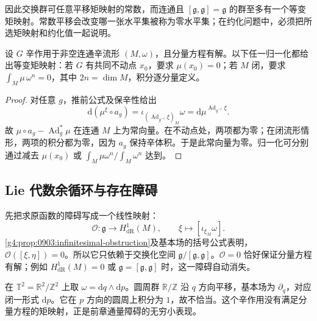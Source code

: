 因此交换群可任意平移矩映射的常数，而连通且 \([\mathfrak g,\mathfrak g]=\mathfrak g\) 的群至多有一个等变矩映射。常数平移会改变哪一张水平集被称为零水平集；在约化问题中，必须把所选矩映射和约化值一起说明。

\begin{proposition}\label{g4:prop:1001:normalization}
	设 \(G\) 辛作用于非空连通辛流形 \((M,\omega)\)，且分量方程有解。以下任一归一化都给出等变矩映射：若 \(G\) 有共同不动点 \(x_0\)，要求 \(\mu(x_0)=0\)；若 \(M\) 闭，要求 \(\int_M\mu\,\omega^n=0\)，其中 \(2n=\dim M\)，积分逐分量定义。
\end{proposition}
\begin{proof}
	对任意 \(g\)，推前公式及保辛性给出
	\[
		\mathrm{d}(\mu^\xi\circ a_g)
		=\iota_{(\operatorname{Ad}_{g^{-1}}\xi)_M}\omega
		=\mathrm{d}\mu^{\operatorname{Ad}_{g^{-1}}\xi}.
	\]
	故 \(\mu\circ a_g-\operatorname{Ad}_g^*\mu\) 在连通 \(M\) 上为常向量。在不动点处，两项都为零；在闭流形情形，两项的积分都为零，因为 \(a_g\) 保持辛体积。于是此常向量为零。归一化可分别通过减去 \(\mu(x_0)\) 或 \(\int_M\mu\omega^n/\int_M\omega^n\) 达到。
\end{proof}

\subsection{Lie 代数余循环与存在障碍}
\label{g4:subsec:1001:04}

先把求原函数的障碍写成一个线性映射：
\begin{equation}\label{g4:eq:1001:first-obstruction}
	\mathcal O:\mathfrak g\longrightarrow H^1_{\mathrm{dR}}(M),
	\qquad \xi\longmapsto[\iota_{\xi_M}\omega].
\end{equation}
\cref{g4:prop:0903:infinitesimal-obstruction}及基本场的括号公式表明，\(\mathcal O([\xi,\eta])=0\)。所以它只依赖于交换化空间 \(\mathfrak g/[\mathfrak g,\mathfrak g]\)。\(\mathcal O=0\) 恰好保证分量方程有解；例如 \(H^1_{\mathrm{dR}}(M)=0\) 或 \(\mathfrak g=[\mathfrak g,\mathfrak g]\) 时，这一障碍自动消失。

\begin{example}\label{g4:exm:1001:torus-obstruction}
	在 \(\mathbb T^2=\mathbb R^2/\mathbb Z^2\) 上取 \(\omega=\mathrm{d}q\wedge\mathrm{d}p\)。圆周群 \(\mathbb R/\mathbb Z\) 沿 \(q\) 方向平移，基本场为 \(\partial_q\)，对应闭一形式 \(\mathrm{d}p\)。它在 \(p\) 方向的圆周上积分为 \(1\)，故不恰当。这个辛作用没有满足分量方程的矩映射，正是前章通量障碍的无穷小表现。
\end{example}

